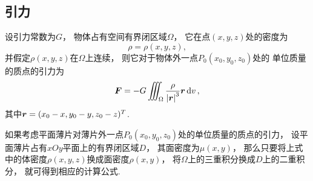 \subsection{引力}
\begin{theorem}
设引力常数为\(G\)，
物体占有空间有界闭区域\(\Omega\)，
它在点\((x,y,z)\)处的密度为\[
	\rho=\rho(x,y,z),
\]
并假定\(\rho(x,y,z)\)在\(\Omega\)上连续，
则它对于物体外一点\(P_0(x_0,y_0,z_0)\)处的
单位质量的质点的引力为\begin{equation}
	\boldsymbol{F}
	= -G \iiint_\Omega \frac{\rho}{\abs{\boldsymbol{r}}^3} \boldsymbol{r} \dd{v},
\end{equation}
其中\(\boldsymbol{r}
= (x_0-x,y_0-y,z_0-z)^T\).
\end{theorem}

如果考虑平面薄片对薄片外一点\(P_0(x_0,y_0,z_0)\)处的单位质量的质点的引力，
设平面薄片占有\(xOy\)平面上的有界闭区域\(D\)，
其面密度为\(\mu(x,y)\)，
那么只要将上式中的体密度\(\rho(x,y,z)\)换成面密度\(\rho(x,y)\)，
将\(\Omega\)上的三重积分换成\(D\)上的二重积分，
就可得到相应的计算公式.
